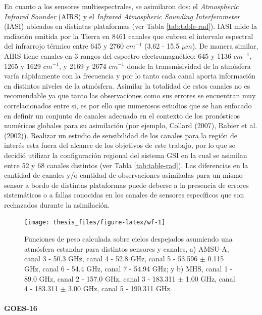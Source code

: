 \documentclass[12pt,oneside,a4paper]{reedthesis}
\begin{document}
En cuanto a los sensores multiespectrales, se asimilaron dos: el \emph{Atmospheric Infrared Sounder} (AIRS) y el \emph{Infrared Atmospheric Sounding Interferometer} (IASI) ubicados en distintas plataformas (ver Tabla \ref{tab:table-rad}). IASI mide la radiación emitida por la Tierra en 8461 canales que cubren el intervalo espectral del infrarrojo térmico entre 645 y 2760 \(cm^{-1}\) (3.62 - 15.5 \(\mu m\)). De manera similar, AIRS tiene canales en 3 rangos del espectro electromagnético: 645 y 1136 \(cm^{-1}\), 1265 y 1629 \(cm^{-1}\), y 2169 y 2674 \(cm^{-1}\) donde la transmisividad de la atmósfera varía rápidamente con la frecuencia y por lo tanto cada canal aporta información en distintos niveles de la atmósfera. Asimilar la totalidad de estos canales no es recomendable ya que tanto las observaciones como sus errores se encuentran muy correlacionados entre si, es por ello que numerosos estudios que se han enfocado en definir un conjunto de canales adecuado en el contexto de los pronósticos numéricos globales para su asimilación (por ejemplo, Collard (2007), Rabier et al. (2002)). Realizar un estudio de sensibilidad de los canales para la región de interés esta fuera del alcance de los objetivos de este trabajo, por lo que se decidió utilizar la configuración regional del sistema GSI en la cual se asimilan entre 52 y 68 canales distintos (ver Tabla \ref{tab:table-rad}). Las diferencias en la cantidad de canales y/o cantidad de observaciones asimiladas para un mismo sensor a bordo de distintas plataformas puede deberse a la presencia de errores sistemáticos o a fallas conocidas en los canales de sensores específicos que son rechazados durante la asimilación.


\begin{figure}

{\centering \texttt{[image: thesis\_files/figure-latex/wf-1]} 

}

\caption{Funciones de peso calculada sobre cielos despejados asumiendo una atmósfera estandar para distintos sensores y canales, a) AMSU-A, canal 3 - 50.3 GHz, canal 4 - 52.8 GHz, canal 5 - 53.596 \(\pm\) 0.115 GHz, canal 6 - 54.4 GHz, canal 7 - 54.94 GHz; y b) MHS, canal 1 - 89.0 GHz, canal 2 - 157.0 GHz, canal 3 - 183.311 \(\pm\) 1.00 GHz, canal 4 - 183.311 \(\pm\) 3.00 GHz, canal 5 - 190.311 GHz.}\label{fig:wf}
\end{figure}
\hypertarget{goes-16}{%
\paragraph{GOES-16}\label{goes-16}}
\end{document}
